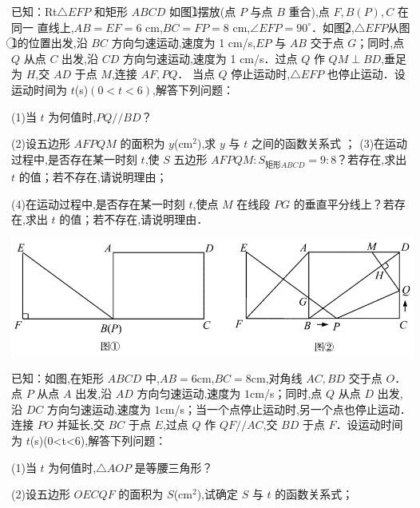 \documentclass[10pt,a4paper]{ctexart}
\newcommand{\nianfen}[1]{\hspace{-2em}{(#1\textbf{·}\textit{青岛}\textbf{·}23)}}
\begin{document}
	\rule{0em}{6em}
	\clearpage
	
	\renewcommand{\nianfen}[1]{\hspace{-2em}{(#1\textbf{·}\textit{青岛}\textbf{·}24)}}
	\nianfen{2017}已知：Rt$ \triangle  EFP $ 和矩形 $ ABCD $ 如图\textcircled{1}摆放(点 $ P $ 与点 $ B $ 重合),点 $ F,B(P),C $ 在同一
	直线上,$ AB=EF=6 $ cm,$ BC=FP=8 $ cm,$ \angle EFP=90^{\circ}$．如图\textcircled{2},$ \triangle  EFP $从图\textcircled{1}的位置出发,沿 $ BC $ 方向匀速运动,速度为 1 cm/s,$ EP $ 与 $ AB $ 交于点 $ G $；同时,点 $ Q $ 从点 $ C $ 出发,沿 $ CD $
	方向匀速运动,速度为 1 cm/s．过点 $ Q $ 作 $ QM\perp  BD $,垂足为 $ H $,交 $ AD $ 于点 $ M $,连接 $ AF,PQ $．
	当点 $ Q $ 停止运动时,$ \triangle  EFP $ 也停止运动．设运动时间为 $ t $(s)$ (0<t<6) $,解答下列问题：
	
	(1)当 $ t $ 为何值时,$ PQ//BD $？
	
	(2)设五边形 $ AFPQM $ 的面积为 $ y $(cm$^2$),求 $ y $ 与 $ t $ 之间的函数关系式
	；
	(3)在运动过程中,是否存在某一时刻 $ t $,使 $ S $ 五边形 $ AFPQM:S_{\mbox{矩形}ABCD}=9:8$？若存在,求出 $ t $ 的值；若不存在,请说明理由；
	
	(4)在运动过程中,是否存在某一时刻 $ t $,使点 $ M $ 在线段 $ PG $ 的垂直平分线上？若存在,求出 $ t $ 的值；若不存在,请说明理由．
	
	\begin{center}
		\includegraphics[width=0.9\linewidth]{24/2017}
	\end{center}

	\clearpage
	
	\nianfen{2016}已知：如图,在矩形 $ ABCD $ 中,$ AB=6$cm,$BC=8$cm,对角线 $ AC,BD $ 交于点 $ O $．点 $ P $ 从点 $ A $ 出发,沿 $ AD $ 方向匀速运动,速度为 $ 1 $cm/s；同时,点 $ Q $ 从点 $ D $ 出发,沿 $ DC $ 方向匀速运动,速度为 $ 1 $cm/s；当一个点停止运动时,另一个点也停止运动．连接 $ PO $ 并延长,交 $ BC $ 于点 $ E $,过点 $ Q $ 作 $ QF//AC $,交 $ BD $ 于点 $ F $．设运动时间为 $ t $(s)(0<t<6),解答下列问题：
	
	(1)当 $ t $ 为何值时,$ \triangle AOP $ 是等腰三角形？
	
	(2)设五边形 $ OECQF $ 的面积为 $ S $(cm$^2$),试确定 $ S $ 与 $ t $ 的函数关系式；
	
\end{document}
